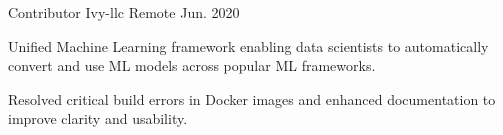 \begin{cventries}
  \cventry
    {Contributor} %
    {Ivy-llc} %
    {Remote} %
    {Jun. 2020} %
    {
      \begin{cvitems} %
        \item {Unified Machine Learning framework enabling data scientists to automatically convert and use ML models across popular ML frameworks.}
        \item {Resolved critical build errors in Docker images and enhanced documentation to improve clarity and usability.}
      \end{cvitems}
    }

\end{cventries}
